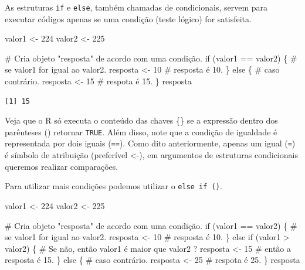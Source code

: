 \documentclass[
  letterpaper,
  DIV=11,
  numbers=noendperiod]{scrreprt}
\newenvironment{Shaded}{\begin{snugshade}}{\end{snugshade}}
\newcommand{\CommentTok}[1]{\textcolor[rgb]{0.37,0.37,0.37}{#1}}
\newcommand{\ControlFlowTok}[1]{\textcolor[rgb]{0.00,0.23,0.31}{#1}}
\newcommand{\DecValTok}[1]{\textcolor[rgb]{0.68,0.00,0.00}{#1}}
\newcommand{\NormalTok}[1]{\textcolor[rgb]{0.00,0.23,0.31}{#1}}
\newcommand{\OtherTok}[1]{\textcolor[rgb]{0.00,0.23,0.31}{#1}}
\newcommand{\SpecialCharTok}[1]{\textcolor[rgb]{0.37,0.37,0.37}{#1}}
\begin{document}
As estruturas \texttt{if} e \texttt{else}, também chamadas de
condicionais, servem para executar códigos apenas se uma condição (teste
lógico) for satisfeita.

\begin{Shaded}
\begin{Highlighting}[]
\NormalTok{valor1 }\OtherTok{\textless{}{-}} \DecValTok{224}
\NormalTok{valor2 }\OtherTok{\textless{}{-}} \DecValTok{225}

\CommentTok{\# Cria objeto "resposta" de acordo com uma condição.}
\ControlFlowTok{if}\NormalTok{ (valor1 }\SpecialCharTok{==}\NormalTok{ valor2) \{ }\CommentTok{\# se valor1 for igual ao valor2.}
\NormalTok{  resposta }\OtherTok{\textless{}{-}} \DecValTok{10} \CommentTok{\# resposta é 10.}
\NormalTok{\} }\ControlFlowTok{else}\NormalTok{ \{ }\CommentTok{\# caso contrário.}
\NormalTok{  resposta }\OtherTok{\textless{}{-}} \DecValTok{15} \CommentTok{\# respota é 15.}
\NormalTok{  \}}
\NormalTok{resposta}
\end{Highlighting}
\end{Shaded}

\begin{verbatim}
[1] 15
\end{verbatim}

Veja que o R só executa o conteúdo das chaves \{\} se a expressão dentro
dos parênteses () retornar \texttt{TRUE}. Além disso, note que a
condição de igualdade é representada por dois iguais (\texttt{==}). Como
dito anteriormente, apenas um igual (\texttt{=}) é símbolo de atribuição
(preferível \textless-), em argumentos de estruturas condicionais
queremos realizar comparações.

Para utilizar mais condições podemos utilizar o \texttt{else\ if\ ()}.

\begin{Shaded}
\begin{Highlighting}[]
\NormalTok{valor1 }\OtherTok{\textless{}{-}} \DecValTok{224}
\NormalTok{valor2 }\OtherTok{\textless{}{-}} \DecValTok{225}

\CommentTok{\# Cria objeto "resposta" de acordo com uma condição.}
\ControlFlowTok{if}\NormalTok{ (valor1 }\SpecialCharTok{==}\NormalTok{ valor2) \{ }\CommentTok{\# se valor1 for igual ao valor2.}
\NormalTok{  resposta }\OtherTok{\textless{}{-}} \DecValTok{10} \CommentTok{\# resposta é 10.}
\NormalTok{\} }\ControlFlowTok{else} \ControlFlowTok{if}\NormalTok{ (valor1 }\SpecialCharTok{\textgreater{}}\NormalTok{ valor2) \{ }\CommentTok{\# Se não, então valor1 é maior que valor2 ?}
\NormalTok{  resposta }\OtherTok{\textless{}{-}} \DecValTok{15} \CommentTok{\# então a resposta é 15.}
\NormalTok{  \} }\ControlFlowTok{else}\NormalTok{ \{ }\CommentTok{\# caso contrário.}
\NormalTok{    resposta }\OtherTok{\textless{}{-}} \DecValTok{25} \CommentTok{\# respota é 25.}
\NormalTok{    \}}
\NormalTok{resposta}
\end{Highlighting}
\end{Shaded}
\end{document}
